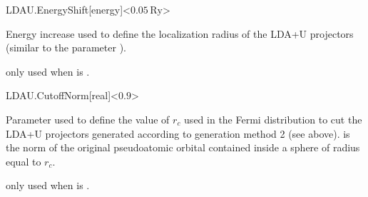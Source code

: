 \begin{fdfentry}{LDAU.EnergyShift}[energy]<$0.05\,\mathrm{Ry}$>
  
  Energy increase used to define the localization radius of the LDA+U
  projectors (similar to the parameter ).

  \note only used when  is .

\end{fdfentry}

\begin{fdfentry}{LDAU.CutoffNorm}[real]<$0.9$>
  
  Parameter used to define the value of $r_c$ used in the Fermi
  distribution to cut the LDA+U projectors generated according to
  generation method 2 (see above).  is the norm of the
  original pseudoatomic orbital contained inside a sphere of radius
  equal to $r_c$.

  \note only used when  is .

\end{fdfentry}


